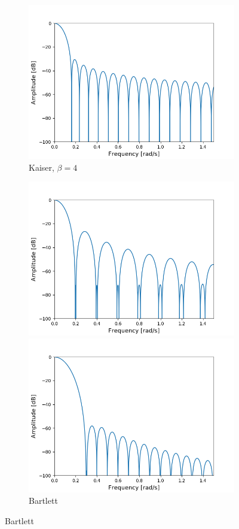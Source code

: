 \begin{figure}[H]
\begin{subfigure}{0.49\textwidth}
\includegraphics[width=\textwidth]{figures/dbplots/stft_bilag/64/kaiser4.png}
\caption{Kaiser, $\beta=4$}
\end{subfigure}
\centering
\begin{subfigure}{0.49\textwidth}
\centering
\includegraphics[width=\textwidth]{figures/dbplots/stft_bilag/64/bartlett.png}
\caption{Bartlett}
\includegraphics[width=\textwidth]{figures/dbplots/stft_bilag/64/blackman.png}

\end{subfigure}
\end{figure}
